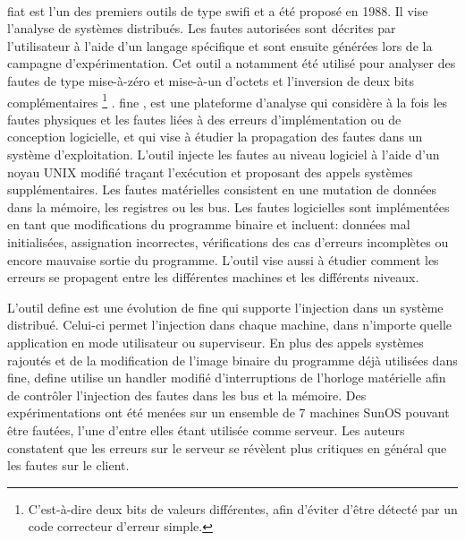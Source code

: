                 \paragraph{}         
                \gls{fiat} \cite{Segall/FTCS88} est l'un des premiers outils de type \gls{swifi} et a été proposé en 1988. Il vise l'analyse de systèmes distribués.
                Les fautes autorisées sont décrites par l'utilisateur à l'aide d'un langage spécifique et sont ensuite générées lors de la campagne d'expérimentation. Cet outil a notamment été utilisé pour analyser des fautes de type mise-à-zéro et mise-à-un d'octets et l'inversion de deux bits complémentaires \footnote{C'est-à-dire deux bits de valeurs différentes, afin d'éviter d'être détecté par un code correcteur d'erreur simple.} \cite{Barton/TC90}.   
                \gls{fine} \cite{Kao/TSE93}, est une plateforme d'analyse qui considère à la fois les fautes physiques et les fautes liées à des erreurs d'implémentation ou de conception logicielle, et qui vise à étudier la propagation des fautes dans un système d'exploitation.
                L'outil injecte les fautes au niveau logiciel à l'aide d'un noyau UNIX modifié traçant l'exécution et proposant des appels systèmes supplémentaires.
                Les fautes matérielles consistent en une mutation de données dans la mémoire, les registres ou les bus. 
                Les fautes logicielles sont implémentées en tant que modifications du programme binaire et incluent: données mal initialisées, assignation incorrectes, vérifications des cas d'erreurs incomplètes ou encore mauvaise sortie du programme.
                L'outil vise aussi à étudier comment les erreurs se propagent entre les différentes machines et les différents niveaux.
    
                L'outil \gls{define} \cite{Kao/FTPDS94} est une évolution de \gls{fine} qui supporte l'injection dans un système distribué. Celui-ci permet l'injection dans chaque machine, dans n'importe quelle application en mode utilisateur ou superviseur. 
                En plus des appels systèmes rajoutés et de la modification de l'image binaire du programme déjà utilisées dans \gls{fine}, \gls{define} utilise un handler modifié d'interruptions de l'horloge matérielle afin de contrôler l'injection des fautes dans les bus et la mémoire.
                Des expérimentations ont été menées sur un ensemble de 7 machines SunOS pouvant être fautées, l'une d'entre elles étant utilisée comme serveur. Les auteurs constatent que les erreurs sur le serveur se révèlent plus critiques en général que les fautes sur le client. 
                

